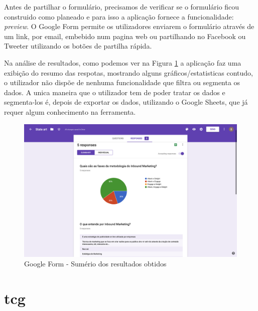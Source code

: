 Antes de partilhar o formulário, precisamos de verificar se o formulário ficou construido como planeado e para isso a aplicação fornece a funcionalidade: \textit{preview}. O Google Form permite os utilizadores enviarem o formulário através de um link, por email, embebido num pagina web ou partilhando no Facebook ou Tweeter utilizando os botões de partilha rápida.

Na análise de resultados, como podemos ver na Figura \ref{fig:gf-form-results} a aplicação faz uma exibição do resumo das respotas, mostrando alguns gráficos/estatisticas contudo, o utilizador não dispõe de nenhuma funcionalidade que filtra ou segmenta os dados. A unica maneira que o utilizador tem de poder tratar os dados e segmenta-los é, depois de exportar os dados, utilizando o Google Sheets, que já requer algum conhecimento na ferramenta. 

\newpage
\mbox{}

\begin{figure}[ht!]
	\begin{center}
		\includegraphics[width=1\textwidth]{img/gf/gf-form-results}
		\caption{Google Form - Sumério dos resultados obtidos}
		\label{fig:gf-form-results}
	\end{center}
\end{figure}

\section{\acrfull{tcg}}
\label{sec:TCG}

